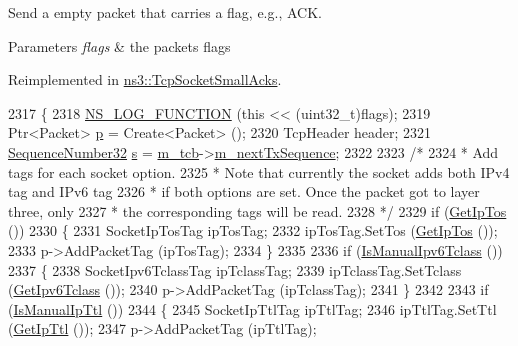 Send a empty packet that carries a flag, e.\+g., A\+CK. 


\begin{DoxyParams}{Parameters}
{\em flags} & the packet\textquotesingle{}s flags \\
\hline
\end{DoxyParams}


Reimplemented in \hyperlink{classns3_1_1TcpSocketSmallAcks_aa1b40c84003225f76661534dfa82634b}{ns3\+::\+Tcp\+Socket\+Small\+Acks}.


\begin{DoxyCode}
2317 \{
2318   \hyperlink{log-macros-disabled_8h_a90b90d5bad1f39cb1b64923ea94c0761}{NS\_LOG\_FUNCTION} (\textcolor{keyword}{this} << (uint32\_t)flags);
2319   Ptr<Packet> \hyperlink{lte__link__budget_8m_ac9de518908a968428863f829398a4e62}{p} = Create<Packet> ();
2320   TcpHeader header;
2321   \hyperlink{group__network_gacb2070e4e98d2d5135c9bede58f07a03}{SequenceNumber32} \hyperlink{generate__test__data__lte__sinr_8m_ad83eeb3a142285d1243a08c6b7026df8}{s} = \hyperlink{classns3_1_1TcpSocketBase_a26bbaf59001308dc43fb630d76f2e38b}{m\_tcb}->\hyperlink{classns3_1_1TcpSocketState_ad1f77b1cbdb9267a89ebb6f16ac76892}{m\_nextTxSequence};
2322 
2323   \textcolor{comment}{/*}
2324 \textcolor{comment}{   * Add tags for each socket option.}
2325 \textcolor{comment}{   * Note that currently the socket adds both IPv4 tag and IPv6 tag}
2326 \textcolor{comment}{   * if both options are set. Once the packet got to layer three, only}
2327 \textcolor{comment}{   * the corresponding tags will be read.}
2328 \textcolor{comment}{   */}
2329   \textcolor{keywordflow}{if} (\hyperlink{classns3_1_1Socket_a95bd4732074d3d26d4a6949fc3499ccb}{GetIpTos} ())
2330     \{
2331       SocketIpTosTag ipTosTag;
2332       ipTosTag.SetTos (\hyperlink{classns3_1_1Socket_a95bd4732074d3d26d4a6949fc3499ccb}{GetIpTos} ());
2333       p->AddPacketTag (ipTosTag);
2334     \}
2335 
2336   \textcolor{keywordflow}{if} (\hyperlink{classns3_1_1Socket_a83858f6116bcdabecf1b63b37514ec8d}{IsManualIpv6Tclass} ())
2337     \{
2338       SocketIpv6TclassTag ipTclassTag;
2339       ipTclassTag.SetTclass (\hyperlink{classns3_1_1Socket_aed62162f0b5f322b1fa23b7350c3c2ce}{GetIpv6Tclass} ());
2340       p->AddPacketTag (ipTclassTag);
2341     \}
2342 
2343   \textcolor{keywordflow}{if} (\hyperlink{classns3_1_1Socket_afbbd0ecd7cda631cafc80eda33aa0b2c}{IsManualIpTtl} ())
2344     \{
2345       SocketIpTtlTag ipTtlTag;
2346       ipTtlTag.SetTtl (\hyperlink{classns3_1_1Socket_adf6420d12b8a0b6a20e46c37fe48830d}{GetIpTtl} ());
2347       p->AddPacketTag (ipTtlTag);

\end{DoxyCode}
